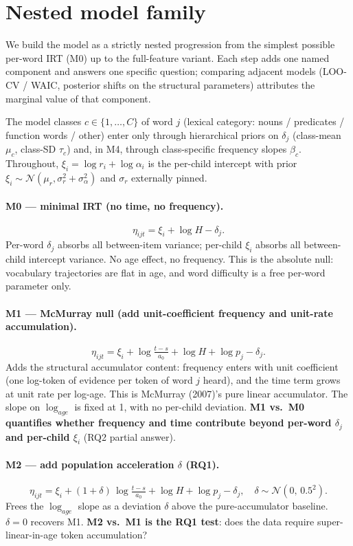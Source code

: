 \documentclass[11pt]{article}
\newcommand{\Norm}{\mathcal{N}}
\begin{document}
\section{Nested model family}
\label{sec:nested}

We build the model as a strictly nested progression from the simplest
possible per-word IRT (M0) up to the full-feature variant. Each step
adds one named component and answers one specific question; comparing
adjacent models (LOO-CV / WAIC, posterior shifts on the structural
parameters) attributes the marginal value of that component.

The model classes \(c \in \{1, \ldots, C\}\) of word \(j\) (lexical
category: nouns / predicates / function words / other) enter only
through hierarchical priors on \(\delta_j\) (class-mean \(\mu_c\),
class-SD \(\tau_c\)) and, in M4, through class-specific frequency
slopes \(\beta_c\). Throughout, \(\xi_i = \log r_i + \log \alpha_i\)
is the per-child intercept with prior
\(\xi_i \sim \Norm(\mu_r, \sigma_r^2 + \sigma_\alpha^2)\) and
\(\sigma_r\) externally pinned.

\paragraph{M0 — minimal IRT (no time, no frequency).}
\[
\eta_{ijt} = \xi_i + \log H - \delta_j.
\]
Per-word \(\delta_j\) absorbs all between-item variance; per-child
\(\xi_i\) absorbs all between-child intercept variance.  No age
effect, no frequency. This is the absolute null: vocabulary
trajectories are flat in age, and word difficulty is a free
per-word parameter only.

\paragraph{M1 — McMurray null (add unit-coefficient frequency and
unit-rate accumulation).}
\[
\eta_{ijt} = \xi_i + \log\!\tfrac{t-s}{a_0} + \log H + \log p_j - \delta_j.
\]
Adds the structural accumulator content: frequency enters with unit
coefficient (one log-token of evidence per token of word \(j\)
heard), and the time term grows at unit rate per log-age. This is
McMurray (2007)'s pure linear accumulator. The slope on
\(\log_{age}\) is fixed at 1, with no per-child deviation.
\textbf{M1 vs.\ M0 quantifies whether frequency and time contribute
beyond per-word \(\delta_j\) and per-child \(\xi_i\)} (RQ2 partial answer).

\paragraph{M2 — add population acceleration \(\delta\) (RQ1).}
\[
\eta_{ijt} = \xi_i + (1 + \delta)\,\log\!\tfrac{t-s}{a_0} + \log H + \log p_j - \delta_j,
\quad \delta \sim \Norm(0,\,0.5^2).
\]
Frees the \(\log_{age}\) slope as a deviation \(\delta\) above the
pure-accumulator baseline. \(\delta = 0\) recovers M1.
\textbf{M2 vs.\ M1 is the RQ1 test}: does the data require
super-linear-in-age token accumulation?
\end{document}
